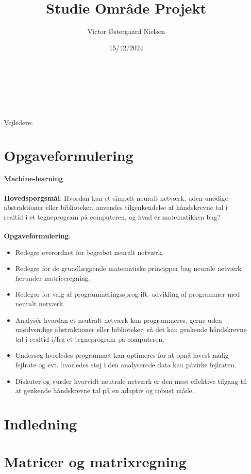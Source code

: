 \documentclass{article}
\title{\Huge{Studie Område Projekt}}
\author{Victor Østergaard Nielsen}
\date{15/12/2024}
\makeatletter
\renewcommand{\maketitle}{\bgroup\setlength{\parindent}{0pt}
\begin{flushleft}
  \textbf{\@title}

  \@subject\\\vspace{1em}
  \@author\\
  \@class\\
  \@date\\\vspace{1em}
  Vejledere:\\\@mentor
\end{flushleft}\egroup
}
\makeatother
\begin{document}
\maketitle
\newpage

\tableofcontents
\newpage

\section{Opgaveformulering}
\textbf{Machine-learning}\\\\
\textbf{Hovedspørgsmål}: Hvordan kan et simpelt neuralt netværk, uden unødige abstraktioner eller biblioteker, anvendes tilgenkendelse af håndskrevne tal i realtid i et tegneprogram på computeren, og hvad er matematikken bag?\\\\
\textbf{Opgaveformulering}:\\
\begin{itemize}
  \item Redegør overordnet for begrebet neuralt netværk.
  \item Redegør for de grundlæggende matematiske principper bag neurale netværk herunder matriceregning.
  \item Redegør for valg af programmeringssprog ift. udvikling af programmer med neuralt netværk.
  \item Analysér hvordan et neutralt netværk kan programmeres, gerne uden unødvendige abstraktioner eller biblioteker, så det kan genkende håndskrevne tal i realtid i/fra et tegneprogram på computeren.
  \item Undersøg hvorledes programmet kan optimeres for at opnå lavest mulig fejlrate og evt. hvorledes støj i den analyserede data kan påvirke fejlraten.
  \item Diskuter og vurder hvorvidt neutrale netværk er den mest effektive tilgang til at genkende håndskrevne tal på en adaptiv og robust måde.
\end{itemize}

\newpage
\section{Indledning}


\newpage
\section{Matricer og matrixregning}
\end{document}
